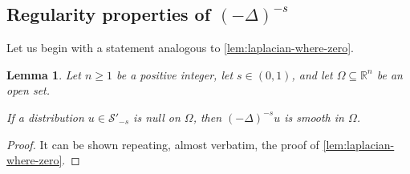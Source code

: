 \documentclass[10pt, reqno]{amsart}
\newcounter{results}[section] %
\theoremstyle{plain}
\newtheorem{lemma}[results]{Lemma}
\theoremstyle{remark}
\theoremstyle{definition}
\numberwithin{equation}{section}
\theoremstyle{plain}
\newcommand{\R}{\ensuremath{\mathbb R}} %
\newcommand{\lapl}{\ensuremath{\Delta}}
\begin{document}
\subsection{Regularity properties of \texorpdfstring{$(-\lapl)^{-s}$}{the inverse fractional Laplacian}}
Let us begin with a statement analogous to \cref{lem:laplacian-where-zero}.

\begin{lemma}\label{lem:inverse-laplacian-where-zero}
    Let $n\ge 1$ be a positive integer, let $s\in (0,1)$, and let $\Omega\subseteq\R^n$ be an open set. 
    
    If a distribution $u\in\mathcal S'_{-s}$ is null on $\Omega$, then $(-\lapl)^{-s}u$ is smooth in $\Omega$. 
\end{lemma}
\begin{proof}
    It can be shown repeating, almost verbatim, the proof of \cref{lem:laplacian-where-zero}.
\end{proof}
\end{document}
